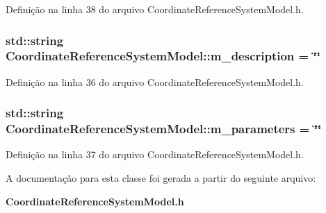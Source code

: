 Definição na linha 38 do arquivo Coordinate\+Reference\+System\+Model.\+h.

\subsubsection[{m\+\_\+description}]{\setlength{\rightskip}{0pt plus 5cm}std\+::string Coordinate\+Reference\+System\+Model\+::m\+\_\+description = \char`\"{}\char`\"{}\hspace{0.3cm}{\ttfamily [protected]}}\label{class_coordinate_reference_system_model_a5b04b3972e0e1404806ce62e03760fb2}


Definição na linha 36 do arquivo Coordinate\+Reference\+System\+Model.\+h.

\subsubsection[{m\+\_\+parameters}]{\setlength{\rightskip}{0pt plus 5cm}std\+::string Coordinate\+Reference\+System\+Model\+::m\+\_\+parameters = \char`\"{}\char`\"{}\hspace{0.3cm}{\ttfamily [protected]}}\label{class_coordinate_reference_system_model_a302f63827fa95fe00f76b3f53f505455}


Definição na linha 37 do arquivo Coordinate\+Reference\+System\+Model.\+h.



A documentação para esta classe foi gerada a partir do seguinte arquivo\+:\begin{DoxyCompactItemize}
\item 
{\bf Coordinate\+Reference\+System\+Model.\+h}\end{DoxyCompactItemize}
